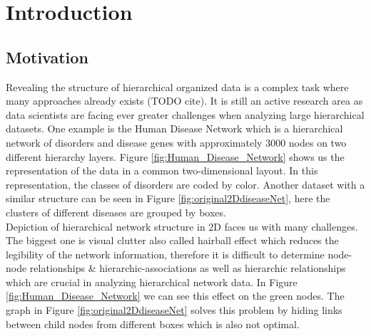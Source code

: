 \chapter{Introduction}

\section{Motivation}
Revealing the structure of hierarchical organized data is a complex task where many approaches already exists (TODO cite). It is still an active research area as data scientists are facing ever greater challenges when analyzing large hierarchical datasets. One example is the Human Disease Network \cite{zhou_human_2014} which is a hierarchical network of disorders and disease genes with approximately 3000 nodes on two different hierarchy layers. Figure \ref{fig:Human_Disease_Network} shows us the representation of the data in a common two-dimensional layout. In this representation, the classes of disorders are coded by color. 
Another dataset with a similar structure can be seen in Figure \ref{fig:original2DdiseaseNet}, here the clusters of different diseases are grouped by boxes.\\ 
Depiction of hierarchical network structure in 2D faces us with many challenges. The biggest one is visual clutter also called hairball effect which reduces the legibility of the network information, therefore it is difficult to determine node-node relationships \& hierarchic-associations as well as hierarchic relationships which are crucial in analyzing hierarchical network data. In Figure \ref{fig:Human_Disease_Network} we can see this effect on the green nodes. The graph in Figure \ref{fig:original2DdiseaseNet} solves this problem by hiding links between child nodes from different boxes which is also not optimal.

